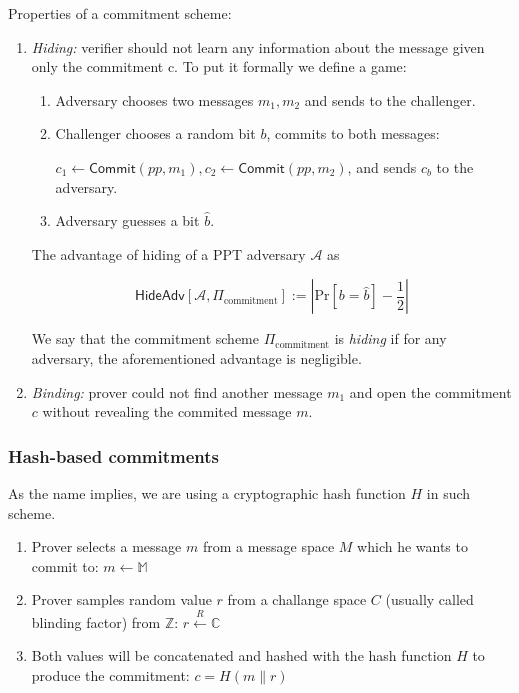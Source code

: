 \documentclass[../lecture-notes.tex]{subfiles}
\begin{document}
\begin{definition}
    Properties of a commitment scheme:
    \begin{enumerate}
        \item \textit{Hiding: } verifier should not learn any information about the message given only the commitment c. To put it formally we define a game:
        \begin{enumerate}
            \item Adversary chooses two messages $m_1,m_2$ and sends to the challenger.
            \item Challenger chooses a random bit $b$, commits to both messages: 
            
                $c_1 \gets \mathsf{Commit}(pp, m_1), c_2 \gets \mathsf{Commit}(pp,m_2)$, and sends $c_b$ to the adversary.
            \item Adversary guesses a bit $\hat{b}$.
        \end{enumerate}
        
        The advantage of hiding of a PPT adversary $\mathcal{A}$ as 
        
        $$
        \mathsf{HideAdv}[\mathcal{A}, \Pi_{\text{commitment}}] := \left| \text{Pr}[b=\hat{b}] - \frac{1}{2} \right|
        $$
        
        We say that the commitment scheme $\Pi_{\text{commitment}}$ is \textit{hiding} if for any adversary, the aforementioned advantage is negligible.
        
        \item \textit{Binding: } prover could not find another message $m_1$ and open the commitment $c$ without revealing the commited message $m$.

    \end{enumerate}
\end{definition}

\subsubsection{Hash-based commitments}

As the name implies, we are using a cryptographic hash function \(H\) in such scheme.

\begin{enumerate}
    \item Prover selects a message $m$ from a message space $M$ which he wants to commit to:
        $m \leftarrow \mathbb{M}$

    \item Prover samples random value $r$ from a challange space $C$ (usually called blinding factor) from $\mathbb{Z}$:
        $r \xleftarrow{R} \mathbb{C}$
    
    \item Both values will be concatenated and hashed with the hash function $H$ to produce the commitment:
        $c = H(m \parallel r)$

\end{enumerate}
\end{document}

